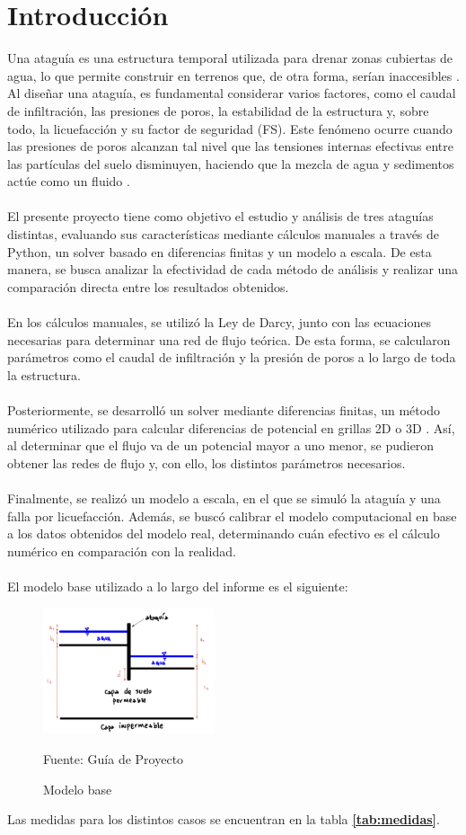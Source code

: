 \part{Introducción}

Una ataguía es una estructura temporal utilizada para drenar zonas cubiertas de agua, lo que permite construir en terrenos que, de otra forma, serían inaccesibles \textbf{\cite{madanayaka2018}}. Al diseñar una ataguía, es fundamental considerar varios factores, como el caudal de infiltración, las presiones de poros, la estabilidad de la estructura y, sobre todo, la licuefacción y su factor de seguridad (FS). Este fenómeno ocurre cuando las presiones de poros alcanzan tal nivel que las tensiones internas efectivas entre las partículas del suelo disminuyen, haciendo que la mezcla de agua y sedimentos actúe como un fluido \textbf{\cite{sumer2009}}.
\\ \\
El presente proyecto tiene como objetivo el estudio y análisis de tres ataguías distintas, evaluando sus características mediante cálculos manuales a través de Python, un solver basado en diferencias finitas y un modelo a escala. De esta manera, se busca analizar la efectividad de cada método de análisis y realizar una comparación directa entre los resultados obtenidos.
\\ \\
En los cálculos manuales, se utilizó la Ley de Darcy, junto con las ecuaciones necesarias para determinar una red de flujo teórica. De esta forma, se calcularon parámetros como el caudal de infiltración y la presión de poros a lo largo de toda la estructura.
\\ \\
Posteriormente, se desarrolló un solver mediante diferencias finitas, un método numérico utilizado para calcular diferencias de potencial en grillas 2D o 3D \textbf{\cite{zhang2005}}. Así, al determinar que el flujo va de un potencial mayor a uno menor, se pudieron obtener las redes de flujo y, con ello, los distintos parámetros necesarios.
\\ \\
Finalmente, se realizó un modelo a escala, en el que se simuló la ataguía y una falla por licuefacción. Además, se buscó calibrar el modelo computacional en base a los datos obtenidos del modelo real, determinando cuán efectivo es el cálculo numérico en comparación con la realidad.
\\ \\
El modelo base utilizado a lo largo del informe es el siguiente:

\begin{figure}[H]
    \centering
    \includegraphics[width=0.45\textwidth]{FOTOS/modelo_base.png}
    \caption{Modelo base}
    Fuente: Guía de Proyecto
    \label{fig:modelo_base}
\end{figure}

Las medidas para los distintos casos se encuentran en la tabla \textbf{\ref{tab:medidas}}.

